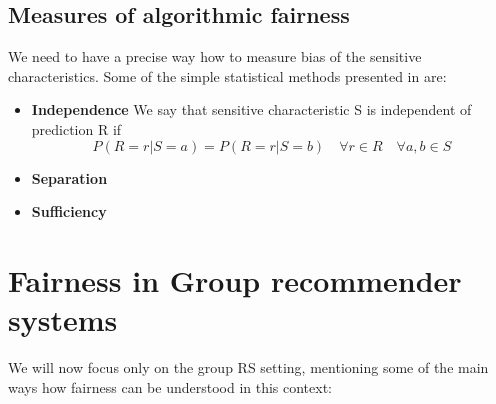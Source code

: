 \subsection{Measures of algorithmic fairness}
We need to have a precise way how to measure bias of the sensitive characteristics. Some of the simple statistical methods presented in \cite{wikipedia-algo-fairness} are:
\begin{itemize}
    \item \textbf{Independence}
    We say that sensitive characteristic S is independent of prediction R if 
    \begin{equation}
        P\left(R = r|S = a\right)=P\left(R=r|S=b\right) \quad \forall r\in R \quad \forall a,b \in S
    \end{equation}
    
    \item \textbf{Separation}
    \item \textbf{Sufficiency}
    
\end{itemize}







\section{Fairness in Group recommender systems} \label{sec:02_fairness_in_grs}


We will now focus only on the group RS setting, mentioning some of the main ways how fairness can be understood in this context:

